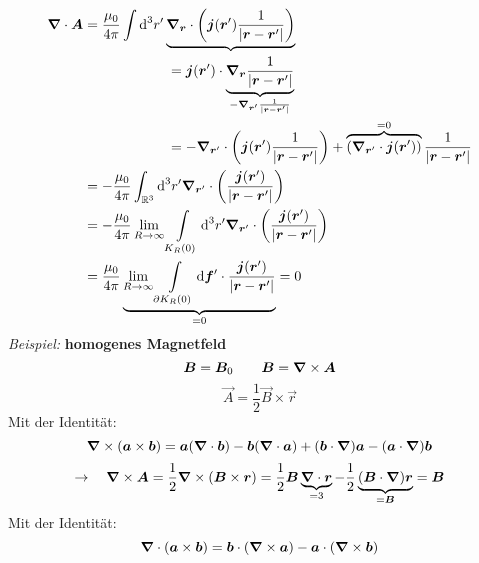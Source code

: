 \begin{align*}
\bm{\nabla} \cdot \bm{A} &= \frac{\mu_0}{4 \pi} \int \textrm{d}^3 r' \underbrace{\bm{\nabla}_{\bm{r}} \cdot \left(\bm{j}(\bm{r}') \frac{1}{|\bm{r} - \bm{r}'|}\right)}\\
& \qquad \qquad \qquad = \bm{j}(\bm{r}') \cdot \underbrace{\bm{\nabla}_{\bm{r}} \frac{1}{|\bm{r} - \bm{r}'|}}_{-\bm{\nabla}_{\bm{r}'} \frac{1}{|\bm{r} - \bm{r}'|}}\\
& \qquad \qquad \qquad = - \bm{\nabla}_{\bm{r}'} \cdot \left(\bm{j}(\bm{r}') \frac{1}{|\bm{r} - \bm{r}'|}\right) + \overbrace{\left(\bm{\nabla}_{\bm{r}'} \cdot \bm{j}(\bm{r}')\right)}^{=0} \frac{1}{|\bm{r} - \bm{r}'|}\\
&= - \frac{\mu_0}{4 \pi} \int_{\mathbb{R}^3} \textrm{d}^3 r' \bm{\nabla}_{\bm{r}'} \cdot \left(\frac{\bm{j}(\bm{r}')}{|\bm{r} - \bm{r}'|}\right)\\
&= - \frac{\mu_0}{4 \pi} \lim\limits_{R \to \infty} \int\limits_{K_R(0)} \textrm{d}^3 r' \bm{\nabla}_{\bm{r}'} \cdot \left(\frac{\bm{j}(\bm{r}')}{|\bm{r} - \bm{r}'|}\right)\\
&= \frac{\mu_0}{4 \pi} \underbrace{\lim\limits_{R\to \infty} \int\limits_{\partial K_R(0)} \textrm{d} \bm{f}' \cdot \frac{\bm{j} (\bm{r}')}{|\bm{r} - \bm{r}'|}}_{=0} = 0
\end{align*}
\emph{Beispiel:} \textbf{homogenes Magnetfeld}
\begin{equation*}
\bm{B} = \bm{B}_0 \qquad \bm{B} = \bm{\nabla} \times \bm{A}
\end{equation*}
\begin{equation*}
\vec{A} = \frac{1}{2} \vec{B} \times \vec{r}
\end{equation*}
Mit der Identität:
\begin{equation*}
\bm{\nabla} \times (\bm{a} \times \bm{b}) = \bm{a} (\bm{\nabla} \cdot \bm{b}) - \bm{b} (\bm{\nabla} \cdot \bm{a}) + (\bm{b} \cdot \bm{\nabla}) \bm{a} - (\bm{a} \cdot \bm{\nabla}) \bm{b}
\end{equation*}
\begin{equation*}
\rightarrow \quad \bm{\nabla} \times \bm{A} = \frac{1}{2} \bm{\nabla} \times (\bm{B} \times \bm{r}) = \frac{1}{2} \bm{B} \underbrace{\bm{\nabla} \cdot \bm{r}}_{= 3} - \frac{1}{2} \underbrace{(\bm{B} \cdot \bm{\nabla}) \bm{r}}_{= \bm{B}} = \bm{B}
\end{equation*}
%
%
%
%
%
%
Mit der Identität:
\begin{equation*}
\bm{\nabla} \cdot (\bm{a} \times \bm{b}) = \bm{b} \cdot (\bm{\nabla} \times \bm{a}) - \bm{a} \cdot (\bm{\nabla} \times \bm{b})
\end{equation*}
